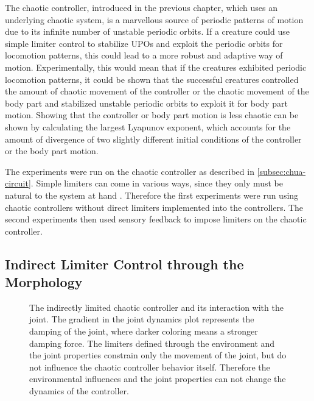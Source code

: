\documentclass[main]{subfiles}
\begin{document}
The chaotic controller, introduced in the previous chapter, which uses an underlying chaotic system, is a marvellous source of periodic patterns of motion due to its infinite number of unstable periodic orbits. %
%
If a creature could use simple limiter control to stabilize UPOs and exploit the periodic orbits for locomotion patterns, this could lead to a more robust and adaptive way of motion. %
%
Experimentally, this would mean that if the creatures exhibited periodic locomotion patterns, it could be shown that the successful creatures controlled the amount of chaotic movement of the controller or the chaotic movement of the body part and stabilized unstable periodic orbits to exploit it for body part motion. %
%
Showing that the controller or body part motion is less chaotic can be shown by calculating the largest Lyapunov exponent, which accounts for the amount of divergence of two slightly different initial conditions of the controller or the body part motion.

The experiments were run on the chaotic controller as described in \ref{subsec:chua-circuit}. %
%
Simple limiters can come in various ways, since they only must be natural to the system at hand \cite{bib:Corron2000}. %
%
Therefore the first experiments were run using chaotic controllers without direct limiters implemented into the controllers. %
%
The second experiments then used sensory feedback to impose limiters on the chaotic controller. 

\subsection{Indirect Limiter Control through the Morphology}

\begin{figure}[H]


\caption[The indirectly limited chaotic controller and joint complex]{The indirectly limited chaotic controller and its interaction with the joint. The gradient in the joint dynamics plot represents the damping of the joint, where darker coloring means a stronger damping force. The limiters defined through the environment and the joint properties constrain only the movement of the joint, but do not influence the chaotic controller behavior itself. Therefore the environmental influences and the joint properties can not change the dynamics of the controller.}
\label{figure:indirect-limit-controller-joint-complex}
\end{figure}
\end{document}
